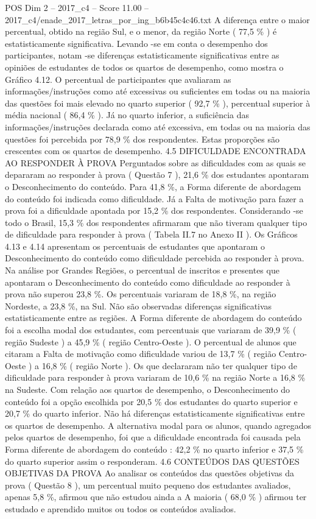 \begin{textsample}{POS Dim 2 – 2017\_c4 – Score 11.00 – 2017\_c4/enade\_2017\_letras\_por\_ing\_b6b45c4c46.txt}
A diferença entre o maior percentual, obtido na região Sul, e o menor, da região Norte ( 77,5 \% ) é estatisticamente significativa.
Levando -se em conta o desempenho dos participantes, notam -se diferenças estatisticamente significativas entre as opiniões de estudantes de todos os quartos de desempenho, como mostra o Gráfico 4.12.
O percentual de participantes que avaliaram as informações/instruções como até excessivas ou suficientes em todas ou na maioria das questões foi mais elevado no quarto superior ( 92,7 \% ), percentual superior à média nacional ( 86,4 \% ).
Já no quarto inferior, a suficiência das informações/instruções declarada como até excessiva, em todas ou na maioria das questões foi percebida por 78,9 \% dos respondentes.
Estas proporções são crescentes com os quartos de desempenho. 4.5 DIFICULDADE ENCONTRADA AO RESPONDER À PROVA Perguntados sobre as dificuldades com as quais se depararam ao responder à prova ( Questão 7 ), 21,6 \% dos estudantes apontaram o Desconhecimento do conteúdo.
Para 41,8 \%, a Forma diferente de abordagem do conteúdo foi indicada como dificuldade.
Já a Falta de motivação para fazer a prova foi a dificuldade apontada por 15,2 \% dos respondentes.
Considerando -se todo o Brasil, 15,3 \% dos respondentes afirmaram que não tiveram qualquer tipo de dificuldade para responder à prova ( Tabela II.7 no Anexo II ).
Os Gráficos 4.13 e 4.14 apresentam os percentuais de estudantes que apontaram o Desconhecimento do conteúdo como dificuldade percebida ao responder à prova.
Na análise por Grandes Regiões, o percentual de inscritos e presentes que apontaram o Desconhecimento do conteúdo como dificuldade ao responder à prova não superou 23,8 \%.
Os percentuais variaram de 18,8 \%, na região Nordeste, a 23,8 \%, na Sul.
Não são observadas diferenças significativas estatisticamente entre as regiões.
A Forma diferente de abordagem do conteúdo foi a escolha modal dos estudantes, com percentuais que variaram de 39,9 \% ( região Sudeste ) a 45,9 \% ( região Centro-Oeste ).
O percentual de alunos que citaram a Falta de motivação como dificuldade variou de 13,7 \% ( região Centro-Oeste ) a 16,8 \% ( região Norte ).
Os que declararam não ter qualquer tipo de dificuldade para responder à prova variaram de 10,6 \% na região Norte a 16,8 \% na Sudeste.
Com relação aos quartos de desempenho, o Desconhecimento do conteúdo foi a opção escolhida por 20,5 \% dos estudantes do quarto superior e 20,7 \% do quarto inferior.
Não há diferenças estatisticamente significativas entre os quartos de desempenho.
A alternativa modal para os alunos, quando agregados pelos quartos de desempenho, foi que a dificuldade encontrada foi causada pela Forma diferente de abordagem do conteúdo : 42,2 \% no quarto inferior e 37,5 \% do quarto superior assim o responderam. 4.6 CONTEÚDOS DAS QUESTÕES OBJETIVAS DA PROVA Ao analisar os conteúdos das questões objetivas da prova ( Questão 8 ), um percentual muito pequeno dos estudantes avaliados, apenas 5,8 \%, afirmou que não estudou ainda a A maioria ( 68,0 \% ) afirmou ter estudado e aprendido muitos ou todos os conteúdos avaliados.

\end{textsample}
